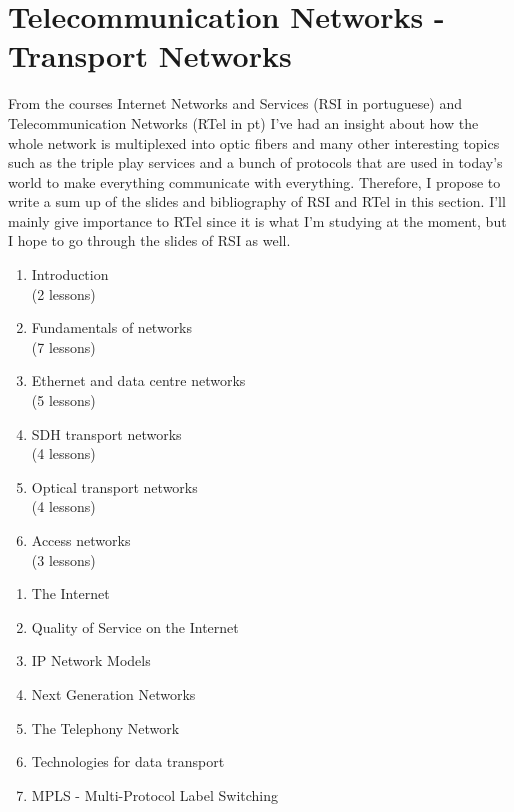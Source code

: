 

\section{Telecommunication Networks - Transport Networks}

From the courses Internet Networks and Services (RSI in portuguese) and Telecommunication Networks (RTel in pt) I've had an insight about how the whole network is multiplexed into optic fibers and many other interesting topics such as the triple play services and a bunch of protocols that are used in today's world to make everything communicate with everything. Therefore, I propose to write a sum up of the slides and bibliography of RSI and RTel in this section. I'll mainly give importance to RTel since it is what I'm studying at the moment, but I hope to go through the slides of RSI as well.

\begin{multicols}{2}
\begin{enumerate}
    \item Introduction \\(2 lessons)
    \item Fundamentals of networks \\(7 lessons)
    \item Ethernet and data centre networks \\(5 lessons)
    \item SDH transport networks \\(4 lessons)
    \item Optical transport networks \\(4 lessons)
    \item Access networks \\(3 lessons)
\end{enumerate}

\columnbreak

\begin{enumerate}
    \item The Internet
    \item Quality of Service on the Internet
    \item IP Network Models
    \item Next Generation Networks
    \item The Telephony Network
    \item Technologies for data transport
    \item MPLS - Multi-Protocol Label Switching
\end{enumerate}
\end{multicols}

